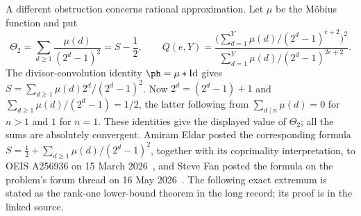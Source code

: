 \documentclass[11pt]{article}
\begin{document}
A different obstruction concerns rational approximation. Let $\mu$ be the
M\"obius function and put
\[
 \Theta_2=\sum_{d\ge1}\frac{\mu(d)}{(2^d-1)^2}=S-\frac12,
 \qquad
 Q(e,Y)=\frac{\bigl(\sum_{d=1}^{Y}\mu(d)/(2^d-1)^{e+2}\bigr)^2}
 {\sum_{d=1}^{Y}\mu(d)/(2^d-1)^{2e+2}}.
\]
The divisor-convolution identity $\ph=\mu*\mathrm{Id}$ gives
$S=\sum_{d\ge1}\mu(d)2^d/(2^d-1)^2$.
Now $2^d=(2^d-1)+1$ and
$\sum_{d\ge1}\mu(d)/(2^d-1)=1/2$, the latter following from
$\sum_{d\mid n}\mu(d)=0$ for $n>1$ and $1$ for $n=1$.
These identities give the displayed value of $\Theta_2$; all the sums are
absolutely convergent. Amiram Eldar posted the corresponding formula
$S=\tfrac12+\sum_{d\ge1}\mu(d)/(2^d-1)^2$, together with its coprimality
interpretation, to OEIS A256936 on 15 March 2026~\cite{eldar2026oeis}, and
Steve Fan posted the formula on the problem's forum thread on
16 May 2026~\cite{fan2026totient}. The following exact extremum is
stated as the rank-one lower-bound theorem in the long record; its proof is
in the linked source.
\end{document}
